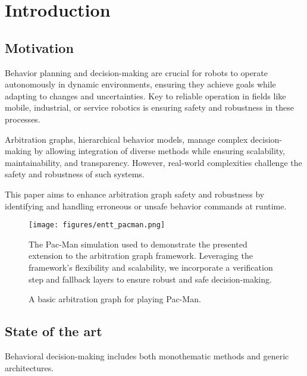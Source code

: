 \section{Introduction}

\subsection{Motivation}

Behavior planning and decision-making are crucial for robots to operate autonomously in dynamic environments, ensuring they achieve goals while adapting to changes and uncertainties.
Key to reliable operation in fields like mobile, industrial, or service robotics is ensuring safety and robustness in these processes.

Arbitration graphs, hierarchical behavior models, manage complex decision-making
by allowing integration of diverse methods while ensuring scalability, maintainability, and transparency.
However, real-world complexities challenge the safety and robustness of such systems.

This paper aims to enhance arbitration graph safety and robustness by identifying and handling erroneous or unsafe behavior commands at runtime.

\begin{figure}
    \centering
    \texttt{[image: figures/entt\_pacman.png]}
    \caption{The Pac-Man simulation used to demonstrate the presented extension to the arbitration graph framework.
    Leveraging the framework's flexibility and scalability,
    we incorporate a verification step and fallback layers
    to ensure robust and safe decision-making.}
    \label{fig:entt-pacman}
\end{figure}

\begin{figure}
    \centering
    
    \caption{A basic arbitration graph for playing Pac-Man.}
    \label{fig:pacman-arbitrator-base}
\end{figure}

\subsection{State of the art}
Behavioral decision-making includes both monothematic methods and generic architectures.

